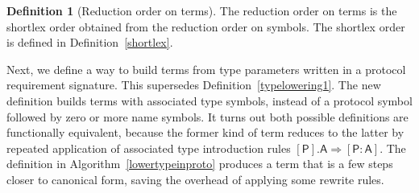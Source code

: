 \documentclass[headsepline,bibliography=totoc]{scrreport}
\newcommand{\namesym}[1]{\mathsf{#1}}
\newcommand{\proto}[1]{\bm{\mathsf{#1}}}
\newcommand{\protosym}[1]{[\proto{#1}]}
\newcommand{\assocsym}[2]{[\proto{#1}\colon\namesym{#2}]}
\theoremstyle{definition}
\theoremstyle{definition}
\newtheorem{definition}{Definition}[chapter]
\theoremstyle{definition}
\begin{document}
\begin{definition}[Reduction order on terms]
The reduction order on terms is the shortlex order obtained from the reduction order on symbols. The shortlex order is defined in Definition~\ref{shortlex}.
\end{definition}

Next, we define a way to build terms from type parameters written in a protocol requirement signature. This supersedes Definition~\ref{typelowering1}. The new definition builds terms with associated type symbols, instead of a protocol symbol followed by zero or more name symbols. It turns out both possible definitions are functionally equivalent, because the former kind of term reduces to the latter by repeated application of associated type introduction rules $\protosym{P}.\namesym{A}\Rightarrow\assocsym{P}{A}$. The definition in Algorithm~\ref{lowertypeinproto} produces a term that is a few steps closer to canonical form, saving the overhead of applying some rewrite rules.
\end{document}
